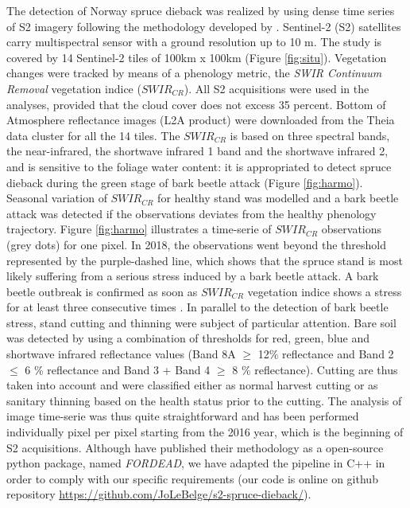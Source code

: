 \documentclass[3p,procedia]{elsarticle}
\begin{document}
The detection of Norway spruce dieback was realized by using dense time series of S2 imagery following the methodology developed by \cite{dutrieux_package_2021}.
Sentinel-2 (S2) satellites carry multispectral sensor with a ground resolution up to 10 m.
The study is covered by 14 Sentinel-2 tiles of 100km x 100km (Figure \ref{fig:situ}).  
Vegetation changes were tracked by means of a phenology metric, the \textit{SWIR Continuum Removal} vegetation indice ($SWIR_{CR}$).
All S2 acquisitions were used in the analyses, provided that the cloud cover does not excess 35 percent. 
Bottom of Atmosphere reflectance images (L2A product) were downloaded from the Theia data cluster \citep{theia_team} for all the 14 tiles.
The $SWIR_{CR}$ is based on three spectral bands, the near-infrared, the shortwave infrared 1 band and the shortwave infrared 2, and is sensitive to the foliage water content: it is appropriated to detect spruce dieback during the green stage of bark beetle attack (Figure \ref{fig:harmo}).
Seasonal variation of $SWIR_{CR}$ for healthy stand was modelled and a bark beetle attack was detected if the observations deviates from the healthy phenology trajectory. 
Figure \ref{fig:harmo} illustrates a time-serie of $SWIR_{CR}$ observations (grey dots) for one pixel. 
In 2018, the observations went beyond the threshold represented by the purple-dashed line, which shows that the spruce stand is most likely suffering from a serious stress induced by a bark beetle attack.
A bark beetle outbreak is confirmed as soon as $SWIR_{CR}$ vegetation indice shows a stress for at least three consecutive times \cite{dutrieux_package_2021}.
In parallel to the detection of bark beetle stress, stand cutting and thinning were subject of particular attention. 
Bare soil was detected by using a combination of thresholds for red, green, blue and shortwave infrared reflectance values (Band 8A $\geq$ 12\% reflectance and Band 2 $\leq$ 6 \% reflectance and Band 3 + Band 4 $\geq$ 8 \% reflectance).
Cutting are thus taken into account and were classified either as normal harvest cutting or as sanitary thinning based on the health status prior to the cutting.
The analysis of image time-serie was thus quite straightforward and has been performed individually pixel per pixel starting from the 2016 year, which is the beginning of S2 acquisitions. 
Although \cite{dutrieux_package_2021} have published their methodology as a open-source python package, named \textit{FORDEAD}, we have adapted the pipeline in C++ in order to comply with our specific requirements (our code is online on github repository \url{https://github.com/JoLeBelge/s2-spruce-dieback/}). 
\end{document}
